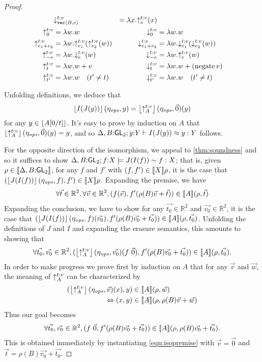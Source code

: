 \begin{proof}
\begin{align*}
&
\mathord\downarrow_{\textup{\texttt{vec}}\langle B,e \rangle}^{t\mathord:v} &= \lambda x. \mathord\uparrow_{e}^{t\mathord:v} (x)
\\
\mathord\uparrow_{0}^{t\mathord:v} &= \lambda w.w
&
\mathord\downarrow_{0}^{t\mathord:v} &= \lambda w.w
\\ 
\mathord\uparrow_{e_1+e_2}^{t\mathord:v} &= \lambda w.\mathord\uparrow_{e_1}^{t\mathord:v}(\mathord\uparrow_{e_2}^{t\mathord:v}(w))
&
\mathord\downarrow_{e_1+e_2}^{t\mathord:v} &= \lambda w.\mathord\downarrow_{e_1}^{t\mathord:v}(\mathord\downarrow_{e_2}^{t\mathord:v}(w))
\\
\mathord\uparrow_{-e}^{t\mathord:v} &= \lambda w.\mathord\downarrow_{e}^{t\mathord:v} (w)
&
\mathord\downarrow_{-e}^{t\mathord:v} &= \lambda w.\mathord\uparrow_{e}^{t\mathord:v} (w)
\\
\mathord\uparrow_{t}^{t\mathord:v} &= \lambda w.w + v 
&
\mathord\downarrow_{t}^{t\mathord:v} &= \lambda w.w + (\mathrm{negate}\, v)
\\
\mathord\uparrow_{t'}^{t\mathord:v} &= \lambda w.w\quad(t'\neq t)
&
\mathord\downarrow_{t'}^{t\mathord:v} &= \lambda w.w\quad(t'\neq t)
\end{align*}


Unfolding definitions, we deduce that
\[
\left\lfloor{I(J(y))}\right\rfloor(\eta_{\mathit{ops}},y) = \left\lfloor{\mathord\uparrow_{A}^{t\mathord:v}}\right\rfloor(\eta_{\mathit{ops}},\vec 0)(y)
\]
for any $y \in \left\lfloor{A[0/t]}\right\rfloor$. It's easy to prove by induction on $A$
that $\left\lfloor{\mathord\uparrow_{A}^{t\mathord:v}}\right\rfloor(\eta_{\mathit{ops}},\vec 0)(y) = y$, and so
${\Delta,B\mathord:\mathsf{GL}_2};{y\mathord:Y}\vdash{I(J(y))}\approx{y}:{Y}$ follows.

For the opposite direction of the isomorphism, we appeal to 
\autoref{thm:soundness} and so it suffices to show
${\Delta,B\mathord:\mathsf{GL}_2};{f\mathord:X}\models{J(I(f))}\sim{f}:{X}$; that
is, given $\rho\in\llbracket \Delta,B\mathord:\mathsf{GL}_2 \rrbracket$, for any $f$ and $f'$ with
$(f,f')\in\llbracket X \rrbracket\rho$, it is the case that 
$(\left\lfloor{J(I(f))}\right\rfloor(\eta_{\mathit{ops}},f), f')\in\llbracket X \rrbracket\rho$.
Expanding the premise, we have
\begin{eqnarray}\label{eqn:isopremise}
\forall \vec{t}\in \mathbb R ^ 2,
\forall \vec{v}\in \mathbb R ^ 2,
(f(\vec{v}),f'(\rho(B)\vec{v} + \vec{t}))\in\llbracket A \rrbracket (\rho,\vec{t})
\end{eqnarray}
Expanding the conclusion, we have to show for any
$\vec{t_0}\in\mathbb R^2$ and $\vec{v_0}\in\mathbb R^2$, it is the case that
$(\left\lfloor{J(I(f))}\right\rfloor(\eta_{\mathit{ops}},f)(\vec{v_0}),f'(\rho(B)\vec{v_0} + \vec{t_0}))\in\llbracket A \rrbracket (\rho,\vec{t_0})$.
Unfolding the definitions of $J$ and $I$ and expanding the erasure semantics, 
this amounts to showing that
\[
\forall \vec{t_0},\vec{v_0}\in \mathbb R ^ 2,
(\left\lfloor{\mathord\uparrow_{A}^{t\mathord:v}}\right\rfloor(\eta_{\mathit{ops}},\vec{v_0})(f\ \vec 0),f'(\rho(B)\vec{v_0} + \vec{t_0}))\in\llbracket A \rrbracket (\rho,\vec{t_0}).
\]
In order to make progress we prove first by induction on $A$ that for any $\vec v$ and $\vec w$, 
the meaning of $\mathord\uparrow_{A}^{t\mathord:v}$ can be characterized by
\begin{align*}
(\left\lfloor{\mathord\uparrow_{A}^{t\mathord:v}}\right\rfloor(\eta_{\mathit{ops}},\vec{v})(x),y)&\in\llbracket A \rrbracket (\rho,\vec{w})
\\\Leftrightarrow 
(x,y)&\in\llbracket A \rrbracket (\rho,\rho(B)\vec{v} + \vec{w})
\end{align*}
Thus our goal becomes
\[
\forall \vec{t_0},\vec{v_0}\in \mathbb R ^ 2,
(f\ \vec 0,f'(\rho(B)\vec{v_0} + \vec{t_0}))\in\llbracket A \rrbracket (\rho,\rho(B)\vec{v_0} + \vec{t_0}).
\]
This is obtained immediately by instantiating \autoref{eqn:isopremise}
with $\vec{v}=\vec 0$ and $\vec{t}=\rho(B)\vec{v_0} + \vec{t_0}$.
\end{proof}


